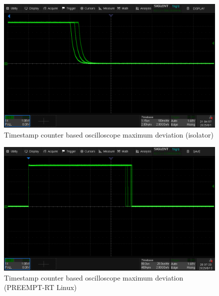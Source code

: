 \documentclass[letterpaper]{article}
\begin{document}
\begin{figure}[h]
  \centering
  \includegraphics[width=0.8\linewidth]{figures/islcountergpio.png}
  \caption{Timestamp counter based oscilloscope maximum deviation (isolator)}
  \label{fig:islcountergpio}
\end{figure}

\begin{figure}[h]
  \centering
  \includegraphics[width=0.8\linewidth]{figures/linuxcountergpio.png}
  \caption{Timestamp counter based oscilloscope maximum deviation (PREEMPT-RT Linux)}
  \label{fig:linuxcountergpio}
\end{figure}



\begin{table}[t]
\centering
{}
\caption{Latency comparison under different configurations.}
\label{tab:latency-comparison}
\end{table}
\end{document}
